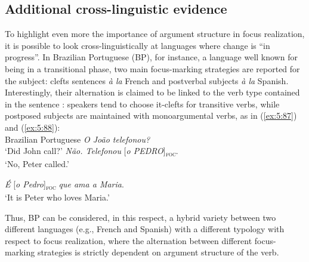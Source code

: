 \subsection{Additional cross-linguistic evidence}
To highlight even more the importance of argument structure in focus realization, it is possible to look cross-linguistically at languages where change is ``in progress”. In Brazilian Portuguese (BP), for instance, a language well known for being in a transitional phase, two main focus-marking strategies are reported for the subject: clefts sentences \textit{à la} French and postverbal subjects \textit{à la} Spanish. Interestingly, their alternation is claimed to be linked to the verb type contained in the sentence \parencite{kato2006focus}: speakers tend to choose it-clefts for transitive verbs, while postposed subjects are maintained with monoargumental verbs, as in (\ref{ex:5:87}) and (\ref{ex:5:88}):\\

\ea \label{ex:5:87} Brazilian Portuguese
\ea \textit{O João telefonou?}\\
 ‘Did John call?'
\ex  \textit{Não. Telefonou} {[\textit{o PEDRO}]\textsubscript{\textsc{foc}}}\normalsize.\\
‘No, Peter called.' \hfill \parencite[9]{kato2006focus}    
\z \z

\ea \label{ex:5:88}
\textit{É} {[\textit{o Pedro}]\textsubscript{\textsc{foc}}} \normalsize \textit{que ama a Maria}.\\
`It is Peter who loves Maria.’ \hfill \parencite[10]{kato2006focus}   
\z


Thus, BP can be considered, in this respect, a hybrid variety between two different languages (e.g., French and Spanish) with a different typology with respect to focus realization, where the alternation between different focus-marking strategies is strictly dependent on argument structure of the verb.

